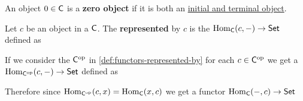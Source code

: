 \documentclass[../main.tex]{subfiles}
\begin{document}
\begin{definition} \label{def:zero-object}
  An object \(0 \in \mathsf{C}\) is a \textbf{zero object} if it is both an \hyperref[def:initial-terminal-object]{initial and terminal object}.
\end{definition}


\begin{definition} \label{def:functors-represented-by}
  Let \(c\) be an object in a  \(\mathsf{C}\).
  The \textbf{ represented} by \(c\) is the  \(\operatorname{Hom}_{\mathsf{C}}(c, -) \to \mathsf{Set}\) defined as
  \begin{center}
  \end{center}
\end{definition}

\begin{remark}
  If we consider the  \(\mathsf{C}^{\operatorname*{op}}\) in \autoref{def:functors-represented-by} for each \(c \in \mathsf{C}^{\operatorname*{op}}\) we get a  \(\operatorname{Hom}_{\mathsf{C}^{\operatorname*{op}}}(c, -) \to \mathsf{Set}\) defined as
  \begin{center}
  \end{center}

  Therefore since \(\operatorname{Hom}_{\mathsf{C}^{\operatorname*{op}}}(c, x) = \operatorname{Hom}_{\mathsf{C}}(x, c)\) we get a functor \(\operatorname{Hom}_{\mathsf{C}}(-, c) \to \mathsf{Set}\)
  \begin{center}
  \end{center}
\end{remark}
\end{document}
